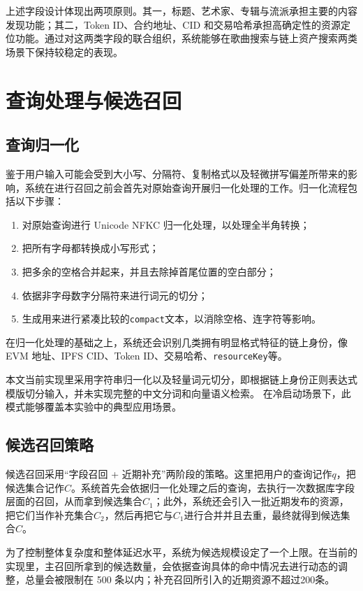 上述字段设计体现出两项原则。其一，标题、艺术家、专辑与流派承担主要的内容发现功能；其二，Token ID、合约地址、CID 和交易哈希承担高确定性的资源定位功能。通过对这两类字段的联合组织，系统能够在歌曲搜索与链上资产搜索两类场景下保持较稳定的表现。


\section{查询处理与候选召回}

\subsection{查询归一化}

鉴于用户输入可能会受到大小写、分隔符、复制格式以及轻微拼写偏差所带来的影响，系统在进行召回之前会首先对原始查询开展归一化处理的工作。归一化流程包括以下步骤：

\begin{enumerate}
    \item 对原始查询进行 Unicode NFKC 归一化处理，以处理全半角转换；
    \item 把所有字母都转换成小写形式；
    \item 把多余的空格合并起来，并且去除掉首尾位置的空白部分；
    \item 依据非字母数字分隔符来进行词元的切分；
    \item 生成用来进行紧凑比较的\texttt{compact}文本，以消除空格、连字符等影响。
\end{enumerate}

在归一化处理的基础之上，系统还会识别几类拥有明显格式特征的链上身份，像 EVM 地址、IPFS CID、Token ID、交易哈希、\texttt{resourceKey}等。

本文当前实现里采用字符串归一化以及轻量词元切分，即根据链上身份正则表达式模版切分输入，并未实现完整的中文分词和向量语义检索。 在冷启动场景下，此模式能够覆盖本实验中的典型应用场景。

\subsection{候选召回策略}

候选召回采用“字段召回 + 近期补充”两阶段的策略。这里把用户的查询记作$q$，把候选集合记作$C$。系统首先会依据归一化处理之后的查询，去执行一次数据库字段层面的召回，从而拿到候选集合$C_1$；此外，系统还会引入一批近期发布的资源，把它们当作补充集合$C_2$，然后再把它与$C_1$进行合并并且去重，最终就得到候选集合$C$。

为了控制整体复杂度和整体延迟水平，系统为候选规模设定了一个上限。在当前的实现里，主召回所拿到的候选数量，会依据查询具体的命中情况去进行动态的调整，总量会被限制在 500 条以内；补充召回所引入的近期资源不超过200条。


